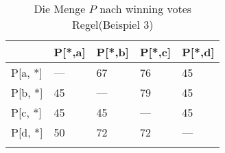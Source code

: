 \begin{longtable}[c]{|l|l|l|l|l|}
\hline
            & P{[}*,a{]} & P{[}*,b{]} & P{[}*,c{]} & P{[}*,d{]} \\ \hline
\endfirsthead
%
\endhead
%
P{[}a, *{]} & ---        & 67         & 76         & 45         \\ \hline
P{[}b, *{]} & 45         & ---        & 79         & 45         \\ \hline
P{[}c, *{]} & 45         & 45         & ---        & 45         \\ \hline
P{[}d, *{]} & 50         & 72         & 72         & ---        \\ \hline
\caption{Die Menge $P$ nach winning votes Regel(Beispiel 3)}
\label{beispiel3win_p}\\
\end{longtable}